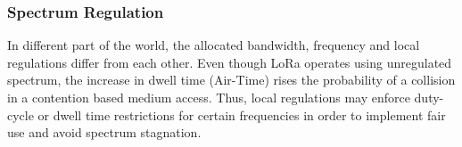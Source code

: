 

\subsubsection{Spectrum Regulation}
In different part of the world, the allocated bandwidth, frequency and local regulations differ from each other.
Even though LoRa operates using unregulated spectrum, the increase in dwell time (Air-Time) rises the probability of a collision in a contention based medium access.
Thus, local regulations may enforce duty-cycle or dwell time restrictions for certain frequencies in order to implement fair use and avoid spectrum stagnation.


